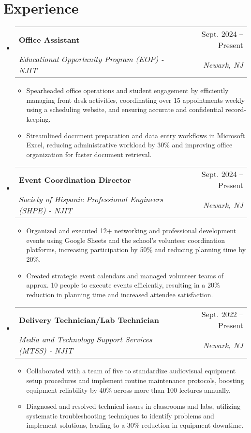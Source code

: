 \documentclass[letterpaper,11pt]{article}
\makeatletter
\newcommand{\resumeItem}[1]{\item\small{{#1 \vspace{-2pt}}}}
\newcommand{\resumeSubheading}[4]{
  \vspace{-2pt}\item
    \begin{tabular*}{0.97\textwidth}[t]{l@{\extracolsep{\fill}}r}
      \textbf{#1} & #2 \\
      \textit{\small#3} & \textit{\small #4} \\
    \end{tabular*}\vspace{-7pt}
}
\newcommand{\resumeSubHeadingListStart}{\begin{itemize}[leftmargin=0.15in, label={}]}
\newcommand{\resumeSubHeadingListEnd}{\end{itemize}}
\newcommand{\resumeItemListStart}{\begin{itemize}}
\newcommand{\resumeItemListEnd}{\end{itemize}\vspace{-5pt}}
\makeatother
\begin{document}
\section{Experience}
  \resumeSubHeadingListStart
    \resumeSubheading
      {Office Assistant}{Sept. 2024 -- Present}
      {Educational Opportunity Program (EOP) - NJIT}{Newark, NJ}
      \resumeItemListStart
        \resumeItem{Spearheaded office operations and student engagement by efficiently managing front desk activities, coordinating over 15 appointments weekly using a scheduling website, and ensuring accurate and confidential record-keeping.}
        \resumeItem{Streamlined document preparation and data entry workflows in Microsoft Excel, reducing administrative workload by 30\% and improving office organization for faster document retrieval.}
      \resumeItemListEnd

    \resumeSubheading
      {Event Coordination Director}{Sept. 2024 -- Present}
      {Society of Hispanic Professional Engineers (SHPE) - NJIT}{Newark, NJ}
      \resumeItemListStart
        \resumeItem{Organized and executed 12+ networking and professional development events using Google Sheets and the school's volunteer coordination platforms, increasing participation by 50\% and reducing planning time by 20\%.}
        \resumeItem{Created strategic event calendars and managed volunteer teams of approx. 10 people to execute events efficiently, resulting in a 20\% reduction in planning time and increased attendee satisfaction.}
      \resumeItemListEnd

    \resumeSubheading
      {Delivery Technician/Lab Technician}{Sept. 2022 -- Present}
      {Media and Technology Support Services (MTSS) - NJIT}{Newark, NJ}
      \resumeItemListStart
        \resumeItem{Collaborated with a team of five to standardize audiovisual equipment setup procedures and implement routine maintenance protocols, boosting equipment reliability by 40\% across more than 100 lectures annually.}
        \resumeItem{Diagnosed and resolved technical issues in classrooms and labs, utilizing systematic troubleshooting techniques to identify problems and implement solutions, leading to a 30\% reduction in equipment downtime.}
      \resumeItemListEnd
  \resumeSubHeadingListEnd

\end{document}

